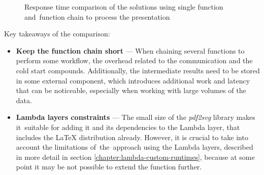 \datasetChainVsSingle

\begin{figure}[H]
    \begin{center}
    \caption{Response time comparison of the solutions using single function and~function chain to process the presentation}
    \label{chart:step-function-single-function-vs-function-chain}
    \end{center}
\end{figure}

Key takeaways of the comparison:

\begin{itemize}
   \item \textbf{Keep the function chain short} --- When chaining several functions to perform some workflow, the overhead related to the communication and the cold start compounds. Additionally, the intermediate results need to be stored in some external component, which introduces additional work and latency that can be noticeable, especially when working with large volumes of the data.
   \item \textbf{Lambda layers constraints} --- The small size of the \textit{pdf2svg} library makes it~suitable for adding it and its dependencies to the Lambda layer, that includes the LaTeX distribution already. However, it is crucial to take into account the limitations of~the~approach using the Lambda layers, described in more detail in section \ref{chapter:lambda-custom-runtimes}, because at some point it may be not possible to extend the function further.
\end{itemize}

